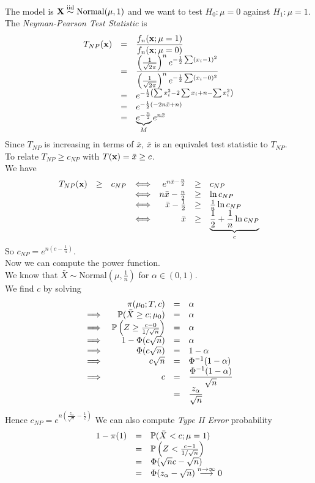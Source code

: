 \documentclass[11pt,a4paper]{article}
\begin{document}
The model is $\textbf{X}\overset{\text{iid}}{\sim}\text{Normal}(\mu,1)$ and we want to test $H_0:\mu=0$ against $H_1:\mu=1$.\\
The \textit{Neyman-Pearson Test Statistic}  is
\[\begin{array}{rcl}
T_{NP}(\textbf{x})&=&\dfrac{f_n(\textbf{x};\mu=1)}{f_n(\textbf{x};\mu=0)}\\
&=&\dfrac{\left(\frac{1}{\sqrt{2\pi}}\right)^ne^{-\frac{1}{2}\sum(x_i-1)^2}}{\left(\frac{1}{\sqrt{2\pi}}\right)^ne^{-\frac{1}{2}\sum(x_i-0)^2}}\\
&=&e^{-\frac{1}{2}\left(\sum x_i^2-2\sum x_i+n-\sum x_i^2\right)}\\
&=&e^{-\frac{1}{2}(-2n\bar{x}+n)}\\
&=&\underbrace{e^{-\frac{n}{2}}}_Me^{n\bar{x}}
\end{array}\]
Since $T_{NP}$ is increasing in terms of $\bar{x}$, $\bar{x}$ is an equivalet test statistic to $T_{NP}$.\\
To relate $T_{NP}\geq c_{NP}$ with $T(\textbf{x})=\bar{x}\geq c$.\\
We have
\[\begin{array}{rclcrcl}
T_{NP}(\textbf{x})&\geq&c_{NP}&\Longleftrightarrow&e^{n\bar{x}-\frac{n}{2}}&\geq&c_{NP}\\
&&&\Longleftrightarrow&n\bar{x}-\frac{n}{2}&\geq&\ln c_{NP}\\
&&&\Longleftrightarrow&\bar{x}-\frac{1}{2}&\geq&\frac{1}{n}\ln c_{NP}\\
&&&\Longleftrightarrow&\bar{x}&\geq&\underbrace{\frac{1}{2}+\frac{1}{n}\ln c_{NP}}_c
\end{array}\]
So $c_{NP}=e^{n(c-\frac{1}{n})}$.\\
Now we can compute the power function.\\
We know that $\bar{X}\sim\text{Normal}(\mu,\frac{1}{n})$ for $\alpha\in(0,1)$.\\
We find $c$ by solving
\[\begin{array}{rrcl}
&\pi(\mu_0;T,c)&=&\alpha\\
\implies&\mathbb{P}(\bar{X}\geq c;\mu_0)&=&\alpha\\
\implies&\mathbb{P}\left(Z\geq\frac{c-0}{1/\sqrt{n}}\right)&=&\alpha\\
\implies&1-\Phi(c\sqrt{n})&=&\alpha\\
\implies&\Phi(c\sqrt{n})&=&1-\alpha\\
\implies&c\sqrt{n}&=&\Phi^{-1}(1-\alpha)\\
\implies&c&=&\dfrac{\Phi^{-1}(1-\alpha)}{\sqrt{n}}\\
&&=&\dfrac{z_{\alpha}}{\sqrt{n}}
\end{array}\]
Hence $c_{NP}=e^{n\left(\frac{z_\alpha}{\sqrt{n}}-\frac{1}{2}\right)}$
We can also compute \textit{Type II Error} probability
\[\begin{array}{rcl}
1-\pi(1)&=&\mathbb{P}(\bar{X}<c;\mu=1)\\
&=&\mathbb{P}\left(Z<\frac{c-1}{1/\sqrt{n}}\right)\\
&=&\Phi(\sqrt{n}c-\sqrt{n})\\
&=&\Phi(z_\alpha-\sqrt{n})\overset{n\to\infty}{\longrightarrow}0
\end{array}\]
\end{document}
